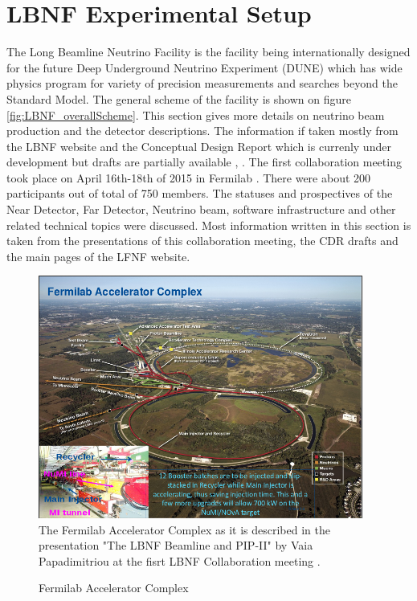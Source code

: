 
\section{LBNF Experimental Setup}

The Long Beamline Neutrino Facility is the facility being internationally designed for the future Deep Underground Neutrino Experiment (DUNE) which has wide physics program for variety of precision measurements and searches beyond the Standard Model. The general scheme of the facility is shown on figure \ref{fig:LBNF_overallScheme}. This section gives more details on neutrino beam production and the detector descriptions. The information if taken mostly from the LBNF website \cite{ref_LBNFweb} and the Conceptual Design Report which is currenly under development but drafts are partially available \cite{ref_LBNFdoc_volume-detectors}, \cite{ref_LBNFdoc_volume-physics}.
The first collaboration meeting took place on April 16th-18th of 2015 in Fermilab \cite{ref_LBNF_collaborationMeeting}. There were about 200 participants out of total of 750 members. The statuses and prospectives of the Near Detector, Far Detector, Neutrino beam, software infrastructure and other related technical topics were discussed. Most information written in this section is taken from the presentations of this collaboration meeting, the CDR drafts and the main pages of the LFNF website.

\begin{figure}
\caption{Fermilab Accelerator Complex}
\label{fig:LBNF_FermilabAccComplex}
\centering
\includegraphics[width=0.95\textwidth, keepaspectratio=true]{figs/FermilabAccelerator.png}
\\The Fermilab Accelerator Complex as it is described in the presentation "The LBNF Beamline and PIP-II" by Vaia Papadimitriou at the fisrt LBNF Collaboration meeting \cite{ref_LBNF_collaborationMeeting}.   
\end{figure}

